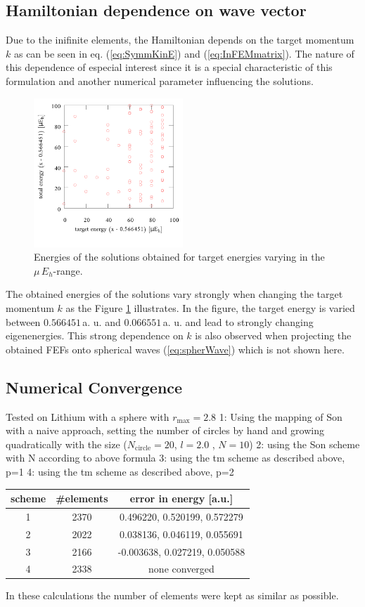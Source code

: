 \subsection{Hamiltonian dependence on wave vector}
Due to the inifinite elements, the Hamiltonian depends on the target momentum $k$ as can be seen in eq. (\ref{eq:SymmKinE}) and (\ref{eq:InFEMmatrix}).
The nature of this dependence of especial interest since it is a special characteristic of this formulation and another numerical parameter influencing the solutions.
\begin{figure}
\includegraphics[width=0.5\textwidth]{Figures/E_k_benchmark}
\caption{Energies of the solutions obtained for target energies varying in the $\mu\,E_h$-range.}
\label{fig:E_k_bm}
\end{figure}
The obtained energies of the solutions vary strongly when changing the target momentum $k$ as the Figure \ref{fig:E_k_bm} illustrates.
In the figure, the target energy is varied between $0.566451\,$a. u. and $0.066551\,$a. u. and lead to strongly changing eigenenergies.
This strong dependence on $k$ is also observed when projecting the obtained FEFs onto spherical waves (\ref{eq:spherWave}) which is not shown here.

\subsection{Numerical Convergence}
Tested on Lithium with a sphere with $r_\text{max}=2.8$
1:  Using the mapping of Son with a naive approach, setting the number of circles by hand and growing quadratically with the size  ($N_\text{circle}=20$, $l= 2.0$ , $N= 10$)
2: using the Son scheme with N according to above formula
3: using the tm scheme as described above, p=1
4: using the tm scheme as described above, p=2

\begin{tabular}{|c|c|c|}
\hline
scheme & \#elements & error in energy [a.u.]\\
\hline
1      & 2370      & 0.496220, 0.520199, 0.572279 \\
2      & 2022      & 0.038136, 0.046119, 0.055691 \\
3      & 2166      &-0.003638, 0.027219, 0.050588 \\
4      & 2338      & none converged \\
\hline
\end{tabular}
In these calculations the number of elements were kept as similar as possible.

